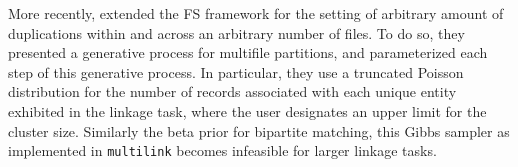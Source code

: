 \documentclass[12pt,letterpaper]{article}
\newcommand{\1}[1]{\mathbb{I}\!\left[#1\right]} %
\begin{document}
More recently, \cite{aleshin2023multifile} extended the FS framework for the setting of arbitrary amount of duplications within and across an arbitrary number of files. To do so, they presented a generative process for multifile partitions, and parameterized each step of this generative process. In particular, they use a truncated Poisson distribution for the number of records associated with each unique entity exhibited in the linkage task, where the user designates an upper limit for the cluster size. Similarly the beta prior for bipartite matching, this Gibbs sampler as implemented in \texttt{multilink} becomes infeasible for larger linkage tasks. 


\end{document}
